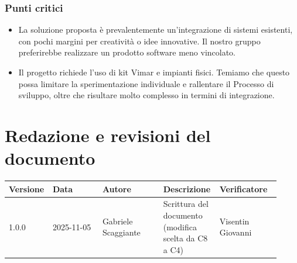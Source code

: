 \documentclass[a4paper,12pt]{article}
\begin{document}
\subsubsection{Punti critici}
\begin{itemize}
    \item La soluzione proposta è prevalentemente un’integrazione di sistemi esistenti, con pochi margini per creatività o idee innovative. Il nostro gruppo preferirebbe realizzare un prodotto software meno vincolato.
    \item Il progetto richiede l’uso di kit Vimar e impianti fisici. Temiamo che questo possa limitare la sperimentazione individuale e rallentare il Processo di sviluppo, oltre che risultare molto complesso in termini di integrazione.
\end{itemize}



\clearpage
\section{Redazione e revisioni del documento}

\begin{center}
\small
\renewcommand{\arraystretch}{1.2} 
\begin{tabular}{|p{0.1\linewidth}|p{0.18\linewidth}|p{0.22\linewidth}|p{0.20\linewidth}|p{0.22\linewidth}|}
\hline
\rowcolor{gray!60} 
\textbf{Versione} & \textbf{Data} & \textbf{Autore} & \textbf{Descrizione} & \textbf{Verificatore} \\
\hline
\rowcolor{white}
1.0.0 & 2025-11-05 & Gabriele Scaggiante & Scrittura del documento (modifica scelta da C8 a C4) & Visentin Giovanni \\
\hline
\end{tabular}
\end{center}
\end{document}
